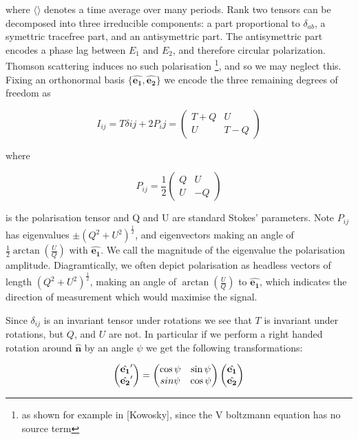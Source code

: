 \documentclass[a4paper,11pt]{article}
\renewcommand{\v}[1]{\mathbf{#1}}
\newcommand{\half}{\frac{1}{2}}
\newcommand{\unit}[1]{\hat{\v{#1}}}
\begin{document}
where $\langle\rangle$ denotes a time average over many periods. Rank two tensors can be decomposed into three irreducible components: a part proportional to $\delta_{ab}$, a symettric tracefree part, and an antisymettric part. The antisymettric part encodes a phase lag between $E_1$ and $E_2$, and therefore circular polarization. Thomson scattering induces no such polarisation \footnote{as shown for example in [Kowosky], since the V boltzmann equation has no source term}, and so we may neglect this. Fixing an orthonormal basis $\{\unit{e_1},\unit{e_2}\}$ we encode the three remaining degrees of freedom as 

\begin{equation}
I_{ij} = T\delta{ij}+2P_ij
=\begin{pmatrix}
T+Q & U\\ 
U & T-Q
\end{pmatrix}
\end{equation}

where 

\begin{equation}
P_{ij} =\half \begin{pmatrix}
Q & U\\ 
U & -Q
\end{pmatrix}
\end{equation}

is the polarisation tensor and Q and U are standard Stokes' parameters. Note $P_{ij}$ has eigenvalues $\pm (Q^2 + U^2)^\half$, and eigenvectors making an angle of $\half\arctan(\frac{U}{Q})$ with $\unit{e_1}$. We call the magnitude of the eigenvalue the polarisation amplitude. Diagramtically, we often depict polarisation as headless vectors of length $(Q^2 + U^2)^\half$, making an angle of $\arctan(\frac{U}{Q})$ to $\unit{e_1}$, which indicates the direction of measurement which would maximise the signal.


Since $\delta_{ij}$ is an invariant tensor under rotations we see that $T$ is invariant under rotations, but $Q$, and $U$ are not. In particular if we perform a right handed rotation around $\unit{n}$ by an angle $\psi$ we get the following transformations:


\begin{equation}
\begin{pmatrix}
\unit{e_1}'\\
\unit{e_2}' 
\end{pmatrix}
=
\begin{pmatrix}
\cos{\psi} & \sin{\psi}\\ 
\-sin{\psi} & \cos{\psi}
\end{pmatrix}
\begin{pmatrix}
\unit{e_1}\\
\unit{e_2} 
\end{pmatrix}
\end{equation}
\end{document}
